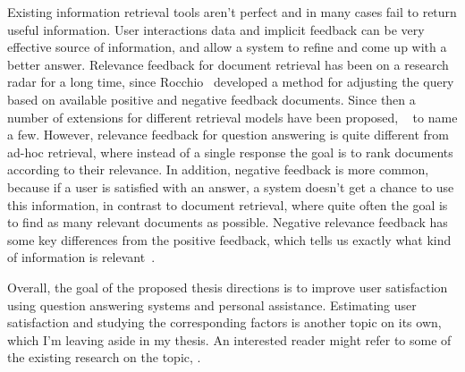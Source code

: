 Existing information retrieval tools aren't perfect and in many cases fail to return useful information.
User interactions data and implicit feedback can be very effective source of information, and allow a system to refine and come up with a better answer.
Relevance feedback for document retrieval has been on a research radar for a long time, since Rocchio~\cite{rocchio1971relevance} developed a method for adjusting the query based on available positive and negative feedback documents.
Since then a number of extensions for different retrieval models have been proposed, \eg ~\cite{salton1997improving,lavrenko2001relevance,lv2010positional,hiemstra2001relevance} to name a few.
However, relevance feedback for question answering is quite different from ad-hoc retrieval, where instead of a single response the goal is to rank documents according to their relevance.
In addition, negative feedback is more common, because if a user is satisfied with an answer, a system doesn't get a chance to use this information, in contrast to document retrieval, where quite often the goal is to find as many relevant documents as possible.
Negative relevance feedback has some key differences from the positive feedback, which tells us exactly what kind of information is relevant~\cite{wang2008study}.

Overall, the goal of the proposed thesis directions is to improve user satisfaction using question answering systems and personal assistance.
Estimating user satisfaction and studying the corresponding factors is another topic on its own, which I'm leaving aside in my thesis.
An interested reader might refer to some of the existing research on the topic, \eg \cite{ong2009measurement,Liu:2008:PIS:1390334.1390417,kiseleva2016understanding}.
